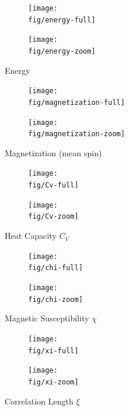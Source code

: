 \documentclass[12pt,a4paper]{article}
\newcommand{\fig}{../fig}
\begin{document}
	\begin{figure}[htb!]
		\centering
		\begin{subfigure}{0.45\linewidth}
			\centering
			\texttt{[image: \\fig/energy-full]}
		\end{subfigure}
		\begin{subfigure}{0.45\linewidth}
			\centering
			\texttt{[image: \\fig/energy-zoom]}
		\end{subfigure}
		\caption{Energy}
	\end{figure}
	\begin{figure}[htb!]
		\centering
		\begin{subfigure}{0.45\linewidth}
			\centering
			\texttt{[image: \\fig/magnetization-full]}
		\end{subfigure}
		\begin{subfigure}{0.45\linewidth}
			\centering
			\texttt{[image: \\fig/magnetization-zoom]}
		\end{subfigure}
		\caption{Magnetization (mean spin)}
	\end{figure}
	\begin{figure}[htb!]
		\centering
		\begin{subfigure}{0.45\linewidth}
			\centering
			\texttt{[image: \\fig/Cv-full]}
		\end{subfigure}
		\begin{subfigure}{0.45\linewidth}
			\centering
			\texttt{[image: \\fig/Cv-zoom]}
		\end{subfigure}
		\caption{Heat Capacity $C_V$}
	\end{figure}
	\begin{figure}[htb!]
		\centering
		\begin{subfigure}{0.45\linewidth}
			\centering
			\texttt{[image: \\fig/chi-full]}
		\end{subfigure}
		\begin{subfigure}{0.45\linewidth}
			\centering
			\texttt{[image: \\fig/chi-zoom]}
		\end{subfigure}
		\caption{Magnetic Susceptibility $\chi$}
	\end{figure}
	\begin{figure}[htb!]
		\centering
		\begin{subfigure}{0.45\linewidth}
			\centering
			\texttt{[image: \\fig/xi-full]}
		\end{subfigure}
		\begin{subfigure}{0.45\linewidth}
			\centering
			\texttt{[image: \\fig/xi-zoom]}
		\end{subfigure}
		\caption{Correlation Length $\xi$}
	\end{figure}
\end{document}
